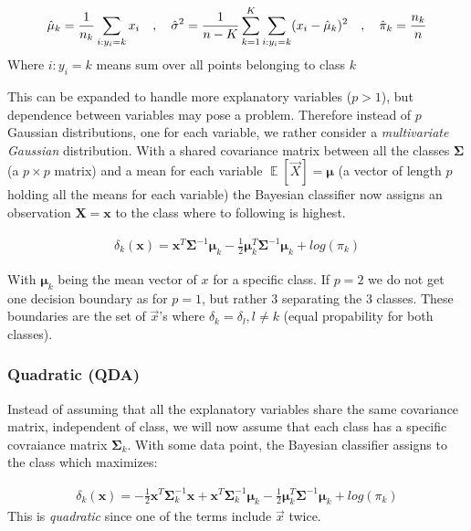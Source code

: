 \documentclass{article}
\renewcommand{\vec}[1]{\mathbf{#1}} %
\newcommand{\vecsym}[1]{\boldsymbol{#1}} %
\DeclareMathOperator*{\E}{\mathbb{E}}
\begin{document}
\begin{align*}
    \hat{\mu}_k = \frac{1}{n_k} \sum_{i:y_i=k} x_i \hspace{10px},\hspace{10px} \hat{\sigma}^2 = \frac{1}{n-K} \sum_{k=1}^{K} \sum_{i:y_i = k} (x_i-\hat{\mu}_k)^2 \hspace{10px},\hspace{10px} \hat{\pi}_k = \frac{n_k}{n}
\end{align*}
Where $i:y_i = k$ means sum over all points belonging to class $k$

This can be expanded to handle more explanatory variables ($p>1$), but dependence between variables may pose a problem. Therefore instead of $p$ Gaussian distributions, one for each variable, we rather consider a \textit{multivariate Gaussian} distribution. With a shared covariance matrix between all the classes $\vec{\Sigma}$ (a $p \times p$ matrix) and a mean for each variable $\E [\Vec{X}] = \vecsym{\mu}$ (a vector of length $p$ holding all the means for each variable) the Bayesian classifier now assigns an observation $\vec{X} = \vec{x}$ to the class where to following is highest.

\begin{align*}
    \delta_k (\vec{x}) = \vec{x}^T \vecsym{\Sigma}^{-1} \vecsym{\mu}_k - \frac{1}{2} \vecsym{\mu}_k^T \vecsym{\Sigma}^{-1} \vecsym{\mu}_k + log(\pi_k)
\end{align*}

With $\vecsym{\mu}_k$ being the mean vector of $x$ for a specific class. If $p = 2$ we do not get one decision boundary as for $p=1$, but rather 3 separating the 3 classes. These boundaries are the set of $\Vec{x}$'s where $\delta_k = \delta_l, l \neq k$ (equal propability for both classes).

\subsubsection{Quadratic (QDA)}
Instead of assuming that all the explanatory variables share the same covariance matrix, independent of class, we will now assume that each class has a specific covraiance matrix $\vecsym{\Sigma}_k$. With some data point, the Bayesian classifier assigns to the class which maximizes:

\begin{align*}
    \delta_k (\vec{x}) = - \frac{1}{2} \vec{x}^T \vecsym{\Sigma}_k^{-1} \vecsym{x} +  \vecsym{x}^T \vecsym{\Sigma}_k^{-1} \vecsym{\mu}_k - \frac{1}{2}\vecsym{\mu}_k^T \vecsym{\Sigma}^{-1} \vecsym{\mu}_k + log(\pi_k)
\end{align*}
This is \textit{quadratic} since one of the terms include $\Vec{x}$ twice.
\end{document}
